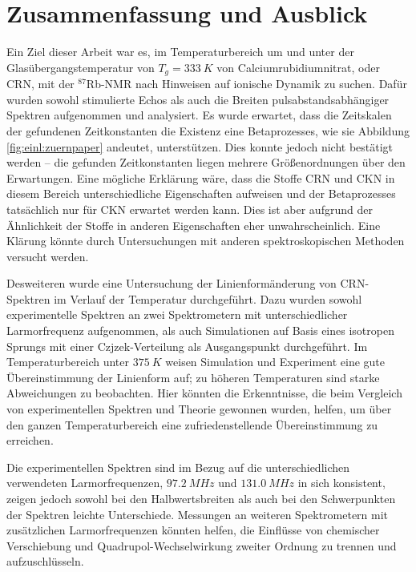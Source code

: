 \chapter{Zusammenfassung und Ausblick}

Ein Ziel dieser Arbeit war es, im Temperaturbereich um und unter der Glasübergangstemperatur von $T_g = \SI{333}{K}$ von Calciumrubidiumnitrat, oder CRN, mit der $^\text{87}$Rb-NMR nach Hinweisen auf ionische Dynamik zu suchen. Dafür wurden sowohl stimulierte Echos als auch die Breiten pulsabstandsabhängiger Spektren aufgenommen und analysiert. Es wurde erwartet, dass die Zeitskalen der gefundenen Zeitkonstanten die Existenz eine Betaprozesses, wie sie Abbildung \ref{fig:einl:zuernpaper} andeutet, unterstützen. Dies konnte jedoch nicht bestätigt werden -- die gefunden Zeitkonstanten liegen mehrere Größenordnungen über den Erwartungen. Eine mögliche Erklärung wäre, dass die Stoffe CRN und CKN in diesem Bereich unterschiedliche Eigenschaften aufweisen und der Betaprozesses tatsächlich nur für CKN erwartet werden kann. Dies ist aber aufgrund der Ähnlichkeit der Stoffe in anderen Eigenschaften eher unwahrscheinlich. Eine Klärung könnte durch Untersuchungen mit anderen spektroskopischen Methoden versucht werden.

Desweiteren wurde eine Untersuchung der Linienformänderung von CRN-Spektren im Verlauf der Temperatur durchgeführt. Dazu wurden sowohl experimentelle Spektren an zwei Spektrometern mit unterschiedlicher Larmorfrequenz aufgenommen, als auch Simulationen auf Basis eines isotropen Sprungs mit einer Czjzek-Verteilung als Ausgangspunkt durchgeführt. Im Temperaturbereich unter $\SI{375}{K}$ weisen Simulation und Experiment eine gute Übereinstimmung der Linienform auf; zu höheren Temperaturen sind starke Abweichungen zu beobachten. Hier könnten die Erkenntnisse, die beim Vergleich von experimentellen Spektren und Theorie gewonnen wurden, helfen, um über den ganzen Temperaturbereich eine zufriedenstellende Übereinstimmung zu erreichen.


Die experimentellen Spektren sind im Bezug auf die unterschiedlichen verwendeten Larmorfrequenzen, $\SI{97.2}{MHz}$ und $\SI{131.0}{MHz}$ in sich konsistent, zeigen jedoch sowohl bei den Halbwertsbreiten als auch bei den Schwerpunkten der Spektren leichte Unterschiede. Messungen an weiteren Spektrometern mit zusätzlichen Larmorfrequenzen könnten helfen, die Einflüsse von chemischer Verschiebung und Quadrupol-Wechselwirkung zweiter Ordnung zu trennen und aufzuschlüsseln.

